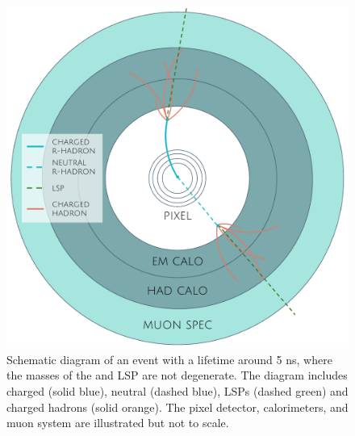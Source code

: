 \begin{figure}[tb]
\centering
\includegraphics[width=\fullfig]{figures/rhadron_metastable_short.pdf}
\caption{Schematic diagram of an \rhadron event with a lifetime around 5 ns, where the masses of the \rhadron and \acs*{LSP} are not degenerate. The diagram includes charged \rhadrons (solid blue), neutral \rhadrons (dashed blue), \acp{LSP} (dashed green) and charged hadrons (solid orange). The pixel detector, calorimeters, and muon system are illustrated but not to scale.}
\label{fig:rhadron_metastable_short}
\end{figure}


